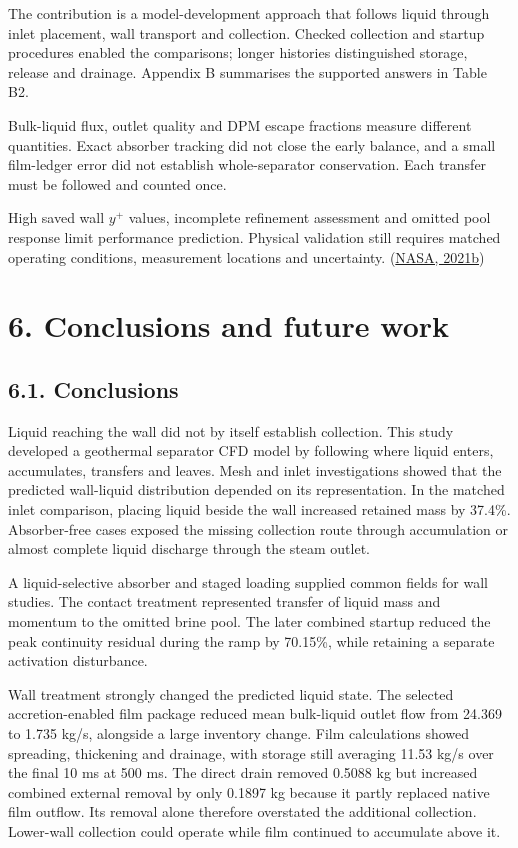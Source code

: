 \documentclass[
  12pt,
  a4paper,
]{article}
\begin{document}
The contribution is a model-development approach that follows liquid
through inlet placement, wall transport and collection. Checked
collection and startup procedures enabled the comparisons; longer
histories distinguished storage, release and drainage. Appendix B
summarises the supported answers in Table B2.

Bulk-liquid flux, outlet quality and DPM escape fractions measure
different quantities. Exact absorber tracking did not close the early
balance, and a small film-ledger error did not establish whole-separator
conservation. Each transfer must be followed and counted once.

High saved wall \(y^+\) values, incomplete refinement assessment and
omitted pool response limit performance prediction. Physical validation
still requires matched operating conditions, measurement locations and
uncertainty.
(\href{https://www.grc.nasa.gov/www/wind/valid/tutorial/valassess.html}{NASA,
2021b})

\section{6. Conclusions and future
work}\label{conclusions-and-future-work}

\subsection{6.1. Conclusions}\label{conclusions}

Liquid reaching the wall did not by itself establish collection. This
study developed a geothermal separator CFD model by following where
liquid enters, accumulates, transfers and leaves. Mesh and inlet
investigations showed that the predicted wall-liquid distribution
depended on its representation. In the matched inlet comparison, placing
liquid beside the wall increased retained mass by 37.4\%. Absorber-free
cases exposed the missing collection route through accumulation or
almost complete liquid discharge through the steam outlet.

A liquid-selective absorber and staged loading supplied common fields
for wall studies. The contact treatment represented transfer of liquid
mass and momentum to the omitted brine pool. The later combined startup
reduced the peak continuity residual during the ramp by 70.15\%, while
retaining a separate activation disturbance.

Wall treatment strongly changed the predicted liquid state. The selected
accretion-enabled film package reduced mean bulk-liquid outlet flow from
24.369 to 1.735 kg/s, alongside a large inventory change. Film
calculations showed spreading, thickening and drainage, with storage
still averaging 11.53 kg/s over the final 10 ms at 500 ms. The direct
drain removed 0.5088 kg but increased combined external removal by only
0.1897 kg because it partly replaced native film outflow. Its removal
alone therefore overstated the additional collection. Lower-wall
collection could operate while film continued to accumulate above it.
\end{document}
